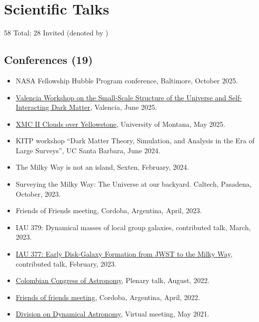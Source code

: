 \documentclass[14pt]{article}
\begin{document}
\section*{Scientific Talks}

58 Total: 28 Invited (denoted by \dag)\\


\subsection*{Conferences (19)}

\begin{itemize}
  \setlength\itemsep{0.0em}
  \renewcommand\labelitemi{$\cdot$}

\item NASA Fellowship Hubble Program conference, Baltimore, October 2025. \dag
  \item \href{https://indico.ific.uv.es/event/7815/}{Valencia Workshop on the Small-Scale Structure of the Universe
    and Self-Interacting Dark Matter}, Valencia, June 2025.
\item \href{https://sites.google.com/view/xmciiworkshop/home}{XMC II Clouds over Yellowstone}, University of Montana, May 2025.
\item KITP workshop ``Dark Matter Theory, Simulation, and Analysis in the Era of Large Surveys'', UC Santa Barbara, June 2024. \dag
\item The Milky Way is not an island, Sexten, February, 2024. 
\item Surveying the Milky Way: The Universe at our backyard. Caltech,
  Pasadena, October, 2023.
\item Friends of Friends meeting, Cordoba, Argentina, April, 2023. \dag
\item IAU 379: Dynamical masses of local group galaxies, contributed talk, March, 2023.
\item \href{https://www.mso.anu.edu.au/~yting/Malaysia_IAU/}{IAU 377: Early Disk-Galaxy Formation
from JWST to the Milky Way}, contributed talk, February, 2023.
\item \href{https://accefyn.com/microsites/nodos/astroco/congreso-colombiano-de-astronomia-cocoa-2022%E2%80%8B/}{Colombian Congress of Astronomy}, Plenary talk, August, 2022. \dag
\item \href{http://fof.oac.uncor.edu/2022/}{Friends of friends meeting}, Cordoba, Argentina, April, 2022.
\item \href{https://aas.org/meetings/dda52}{Division on Dynamical Astronomy}, Virtual meeting, May 2021.

\end{itemize}
\end{document}
